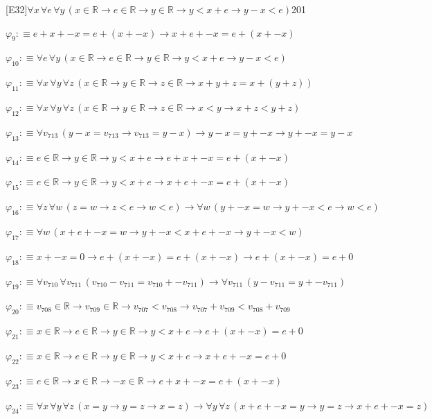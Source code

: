 \begin{fullproof}{[E32]}{$\forall x\,\forall e\,\forall y\,(x \in \mathbb{R} \to e \in \mathbb{R} \to y \in \mathbb{R} \to y < x + e \to y - x < e)$}{201}
\begin{abbrevlist}
\item $\varphi_{9} :\equiv e + x + -x = e + (x + -x) \to x + e + -x = e + (x + -x)$
\item $\varphi_{10} :\equiv \forall e\,\forall y\,(x \in \mathbb{R} \to e \in \mathbb{R} \to y \in \mathbb{R} \to y < x + e \to y - x < e)$
\item $\varphi_{11} :\equiv \forall x\,\forall y\,\forall z\,(x \in \mathbb{R} \to y \in \mathbb{R} \to z \in \mathbb{R} \to x + y + z = x + (y + z))$
\item $\varphi_{12} :\equiv \forall x\,\forall y\,\forall z\,(x \in \mathbb{R} \to y \in \mathbb{R} \to z \in \mathbb{R} \to x < y \to x + z < y + z)$
\item $\varphi_{13} :\equiv \forall v_{713}\,(y - x = v_{713} \to v_{713} = y - x) \to y - x = y + -x \to y + -x = y - x$
\item $\varphi_{14} :\equiv e \in \mathbb{R} \to y \in \mathbb{R} \to y < x + e \to e + x + -x = e + (x + -x)$
\item $\varphi_{15} :\equiv e \in \mathbb{R} \to y \in \mathbb{R} \to y < x + e \to x + e + -x = e + (x + -x)$
\item $\varphi_{16} :\equiv \forall z\,\forall w\,(z = w \to z < e \to w < e) \to \forall w\,(y + -x = w \to y + -x < e \to w < e)$
\item $\varphi_{17} :\equiv \forall w\,(x + e + -x = w \to y + -x < x + e + -x \to y + -x < w)$
\item $\varphi_{18} :\equiv x + -x = 0 \to e + (x + -x) = e + (x + -x) \to e + (x + -x) = e + 0$
\item $\varphi_{19} :\equiv \forall v_{710}\,\forall v_{711}\,(v_{710} - v_{711} = v_{710} + -v_{711}) \to \forall v_{711}\,(y - v_{711} = y + -v_{711})$
\item $\varphi_{20} :\equiv v_{708} \in \mathbb{R} \to v_{709} \in \mathbb{R} \to v_{707} < v_{708} \to v_{707} + v_{709} < v_{708} + v_{709}$
\item $\varphi_{21} :\equiv x \in \mathbb{R} \to e \in \mathbb{R} \to y \in \mathbb{R} \to y < x + e \to e + (x + -x) = e + 0$
\item $\varphi_{22} :\equiv x \in \mathbb{R} \to e \in \mathbb{R} \to y \in \mathbb{R} \to y < x + e \to x + e + -x = e + 0$
\item $\varphi_{23} :\equiv e \in \mathbb{R} \to x \in \mathbb{R} \to -x \in \mathbb{R} \to e + x + -x = e + (x + -x)$
\item $\varphi_{24} :\equiv \forall x\,\forall y\,\forall z\,(x = y \to y = z \to x = z) \to \forall y\,\forall z\,(x + e + -x = y \to y = z \to x + e + -x = z)$

\end{abbrevlist}
\end{fullproof}
